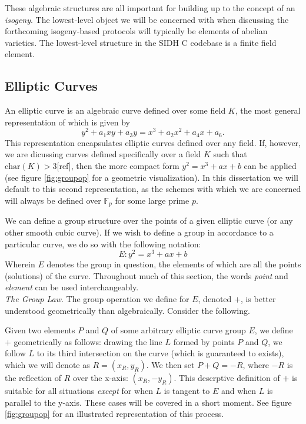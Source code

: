 These algebraic structures are all important for building up to the concept of an \emph{isogeny}. The lowest-level object we will be concerned with when discussing the forthcoming isogeny-based protocols will typically be elements of abelian varieties. The lowest-level structure in the SIDH C codebase is a finite field element.\\

\subsection{Elliptic Curves}

An elliptic curve is an algebraic curve defined over some field $K$, the most general representation of which is given by
$$
y^2 + a_{1}xy + a_{3}y = x^3 + a_{2}x^2 + a_{4}x + a_6.
$$
This representation encapsulates elliptic curves defined over any field. If, however, we are dicussing curves defined specifically over a field $K$ such that $\text{char}(K) > 3$[ref], then the more compact form $y^2 = x^3 + ax + b$ can be applied (see figure \ref{fig:groupop} for a geometric visualization). In this dissertation we will default to this second representation, as the schemes with which we are concerned will always be defined over $\mathbb{F}_p$ for some large prime $p$.

We can define a group structure over the points of a given elliptic curve (or any other smooth cubic curve). If we wish to define a group in accordance to a particular curve, we do so with the following notation:
$$
E: y^2 = x^3 + ax + b
$$
Wherein $E$ denotes the group in question, the elements of which are all the points (solutions) of the curve. Throughout much of this section, the words \emph{point} and \emph{element} can be used interchangeably.\\

\noindent
\emph{The Group Law}. The group operation we define for $E$, denoted $+$, is better understood geometrically than algebraically. Consider the following.

Given two elements $P$ and $Q$ of some arbitrary elliptic curve group $E$, we define $+$ geometrically as follows: drawing the line $L$ formed by points $P$ and $Q$, we follow $L$ to its third intersection on the curve (which is guaranteed to exists), which we will denote as $R = (x_R, y_R)$. We then set $P + Q = -R$, where $-R$ is the reflection of $R$ over the x-axis: $(x_R, -y_R)$. This descrptive definition of $+$ is suitable for all situations \emph{except} for when $L$ is tangent to $E$ and when $L$ is parallel to the y-axis. These cases will be covered in a short moment. See figure \ref{fig:groupop} for an illustrated representation of this process.

